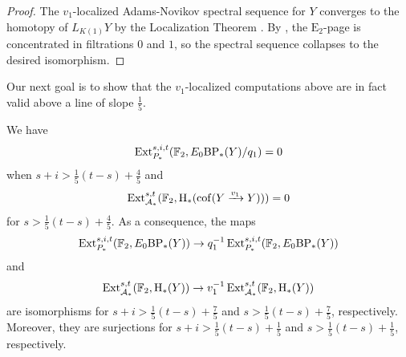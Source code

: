 \begin{proof}
    The $v_1$-localized Adams-Novikov spectral sequence for $Y$ converges to the homotopy of $L_{K(1)} Y$ by the Localization Theorem \cite[Theorem 7.5.2]{RavenelOrange}. By , the $\mathrm{E}_2$-page is concentrated in filtrations $0$ and $1$, so the spectral sequence collapses to the desired isomorphism.
\end{proof}

Our next goal is to show that the $v_1$-localized computations above are in fact valid above a line of slope $\frac{1}{5}$.

\begin{lem}\label{lemm:vanishing-results}
    We have \[\operatorname{\mathrm{Ext}}^{s,i,t} _{P_*} (\operatorname{\mathbb{F}}_2, E_0 \mathrm{BP}_* (Y) / q_1) = 0\] when $s+i > \frac{1}{5} (t-s) + \frac{4}{5}$ and \[\operatorname{\mathrm{Ext}}^{s,t} _{\operatorname{\mathcal{A}}_*} (\operatorname{\mathbb{F}}_2, \mathrm{H}_* (\operatorname{\mathrm{cof}}(Y \xrightarrow{v_1} Y))) = 0\] for $s > \frac{1}{5} (t-s) + \frac{4}{5}$. As a consequence, the maps \[\operatorname{\mathrm{Ext}}^{s,i,t} _{P_*} (\operatorname{\mathbb{F}}_2, E_0 \mathrm{BP}_* (Y)) \to q_1 ^{-1} \operatorname{\mathrm{Ext}}^{s,i,t} _{P_*} (\operatorname{\mathbb{F}}_2, E_0 \mathrm{BP}_* (Y))\] and \[\operatorname{\mathrm{Ext}}^{s,t} _{\operatorname{\mathcal{A}}_*} (\operatorname{\mathbb{F}}_2, \mathrm{H}_* (Y)) \to v_1 ^{-1} \operatorname{\mathrm{Ext}}^{s,t} _{\operatorname{\mathcal{A}}_*} (\operatorname{\mathbb{F}}_2, \mathrm{H}_* (Y))\] are isomorphisms for $s+i > \frac{1}{5} (t-s) + \frac{7}{5}$ and $s > \frac{1}{5} (t-s) + \frac{7}{5}$, respectively. Moreover, they are surjections for $s + i > \frac{1}{5}(t-s) + \frac{1}{5}$ and $s > \frac{1}{5}(t-s) + \frac{1}{5}$, respectively.
\end{lem}


